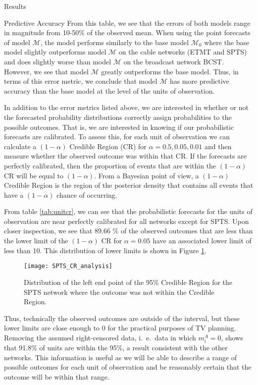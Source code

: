 \begin{chapter}{Results}
\begin{section}{Predictive Accuracy}
    From this table, we see that the errors of both models range in magnitude from 10-50\%
    of the observed mean. When using the point forecasts of model $\mathcal{M}$, the
    model performs similarly to the base model $\mathcal{M}_0$ where the base model slightly outperforms
    model $\mathcal{M}$ on the cable networks (ETMT and SPTS) and does slightly worse than model $\mathcal{M}$
    on the broadcast network BCST. However, we see that model $\mathcal{M}$ greatly outperforms the base model.
    Thus, in terms of this error metric, we conclude that model $\mathcal{M}$ has more predictive accuracy
    than the base model at the level of the units of observation.

    In addition to the error metrics listed above, we are interested in whether or not the forecasted
    probability distributions correctly assign probabilities to the possible outcomes. That is, we
    are interested in knowing if our probabilistic forecasts are calibrated. To assess this,
    for each unit of observation we can calculate a $(1 - \alpha)$ Credible Region (CR) for $\alpha = 0.5, 0.05, 0.01$
    and then measure whether the observed outcome was within that CR. If the forecasts are perfectly calibrated, then the proportion
    of events that are within the $(1 - \alpha)$ CR will be equal to $(1 - \alpha)$.
    From a Bayesian point of view, a $(1- \alpha)$ Credible Region is the region of the posterior density
    that contains all events that have a $(1- \alpha)$ chance of occurring.

    From table \ref{tab:unitcr}, we can see that the probabilistic forecasts for the units of observation
    are near perfectly calibrated for all networks except for SPTS. Upon closer inspection,
    we see that 89.66 \% of the observed outcomes that are less than the lower limit of the $(1 - \alpha)$ CR for $\alpha = 0.05$
    have an associated lower limit of less than 10. This distribution of lower limits is shown in
    Figure \ref{fig:cranalysis}.
    \begin{figure}[!h]
      \centering
      \texttt{[image: SPTS\_CR\_analysis]}
      \caption{Distribution of the left end point of the 95\% Credible Region for the SPTS network where the outcome was not within the Credible Region.}
      \label{fig:cranalysis}
    \end{figure}
    Thus, technically the observed outcomes are outside of the interval,
    but these lower limits are close enough to 0 for the practical purposes of TV planning.
    Removing the assumed right-censored data, i.\ e.\ data in which $m_i^A = 0$,
    shows that 91.8\% of units are within the 95\%, a result consistent with the other networks.
    This information is useful as we will be able to describe a range of possible outcomes for each
    unit of observation and be reasonably certain that the outcome will be within that range.


\end{section}
\end{chapter}
